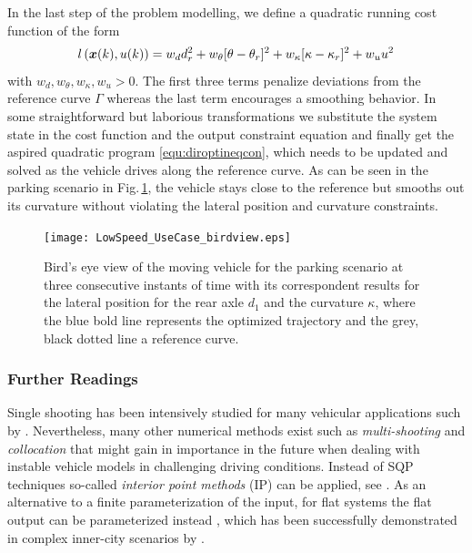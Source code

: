 In the last step of the problem modelling, we define a quadratic running cost function of the form 
\begin{align}
	l\left(\vektor x(k), u(k)\right) = w_d d_r^2 + w_\theta [\theta - \theta_r]^2 + w_\kappa [\kappa-\kappa_r]^2 + w_u u^2
	\label{equ:CostFunction}
\end{align}
with $w_d, w_\theta, w_\kappa, w_u > 0$. The first three terms penalize deviations from the reference curve $\Gamma$ whereas the last term encourages a smoothing behavior.
In some straightforward but laborious transformations we substitute the system state in the cost function and the output constraint equation and finally get the aspired quadratic program \eqref{equ:diroptineqcon}, which needs to be updated and solved as the vehicle drives along the reference curve. As can be seen in the parking scenario in Fig.\,\ref{fig:LowSpeedBirdView}, the vehicle stays close to the reference but smooths out its curvature without violating the lateral position and curvature constraints.


\begin{figure}[t!]
\centering

\renewcommand{\matlabtextA}{\tiny}
	\def\ylabelDr{$d_1$}
	\def\ylabelKappa{$\kappa_r, \kappa$ in \unitfrac{1}{m}}
	\def\xlabelDr{$s_r$ in \unit{m}}
	\def\xlabelKappa{$k$}
\texttt{[image: LowSpeed\_UseCase\_birdview.eps]}
\caption{Bird's eye view of the moving vehicle for the parking scenario at three consecutive instants of time with its correspondent results for the lateral position for the rear axle $d_1$ and the curvature $\kappa$, where the blue bold line represents the optimized trajectory and the grey, black dotted line a reference curve.}
\label{fig:LowSpeedBirdView}
\end{figure}

\subsubsection{Further Readings}\label{S:57.3.2.3}

Single shooting has been intensively studied for many vehicular applications such by \cite{kelly2003reactive,Falcone2007,howard2007optimal,Yoon2009,gerdts2009generating, park2009obstacle}. 
Nevertheless, many other numerical methods exist such as \emph{multi-shooting} \cite{bock-direct-multiple-shooting} and \emph{collocation} \cite{hargraves1987direct} that might gain in importance in the future when dealing with instable vehicle models in challenging driving conditions. 
Instead of SQP techniques so-called \emph{interior point methods} (IP) can be applied, see \cite{nocedal2006numerical}.
As an alternative to a finite parameterization of the input, for flat systems \cite{rouchon1993flatness1}
the flat output can be parameterized instead \cite{kang2012online}, which has been successfully demonstrated in complex inner-city scenarios by \cite{ziegler2014trajectory}.

